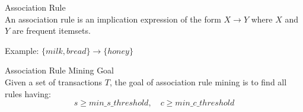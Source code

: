 \begin{definition}{Association Rule}\\
An association rule is an implication expression of the form $X \rightarrow Y$ where $X$ and $Y$ are frequent itemsets.

Example: $\{milk, bread\} \rightarrow \{honey\}$
\end{definition}

\begin{definition}{Association Rule Mining Goal}\\
Given a set of transactions $T$, the goal of association rule mining is to find all rules having:
$$s \geq min\_s\_threshold, \quad c \geq min\_c\_threshold$$
\end{definition}

